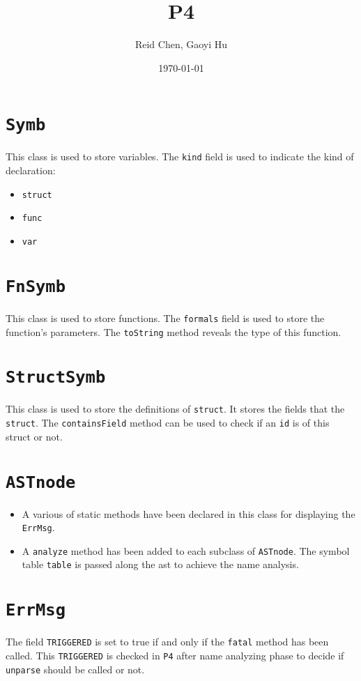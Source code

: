 \documentclass[11pt]{article}
\author{Reid Chen, Gaoyi Hu}
\date{\today}
\title{P4}
\begin{document}
\maketitle
\tableofcontents



\section{\texttt{Symb}}
\label{sec:org95908c0}
This class is used to store variables. The \texttt{kind} field is used to indicate the kind of declaration:
\begin{itemize}
\item \texttt{struct}
\item \texttt{func}
\item \texttt{var}
\end{itemize}
\section{\texttt{FnSymb}}
\label{sec:org7634e91}
This class is used to store functions. The \texttt{formals} field is used to store the function's parameters. The \texttt{toString} method reveals the type of this function.
\section{\texttt{StructSymb}}
\label{sec:orgc3f72ff}
This class is used to store the definitions of \texttt{struct}. It stores the fields that the \texttt{struct}. The \texttt{containsField} method can be used to check if an \texttt{id} is of this struct or not.
\section{\texttt{ASTnode}}
\label{sec:orgd754bb8}
\begin{itemize}
\item A various of static methods have been declared in this class for displaying the \texttt{ErrMsg}.
\item A \texttt{analyze} method has been added to each subclass of \texttt{ASTnode}. The symbol table \texttt{table} is passed along the ast to achieve the name analysis.
\end{itemize}
\section{\texttt{ErrMsg}}
\label{sec:orgbe0bccc}
The field \texttt{TRIGGERED} is set to true if and only if the \texttt{fatal} method has been called. This \texttt{TRIGGERED} is checked in \texttt{P4} after name analyzing phase to decide if \texttt{unparse} should be called or not.
\end{document}
